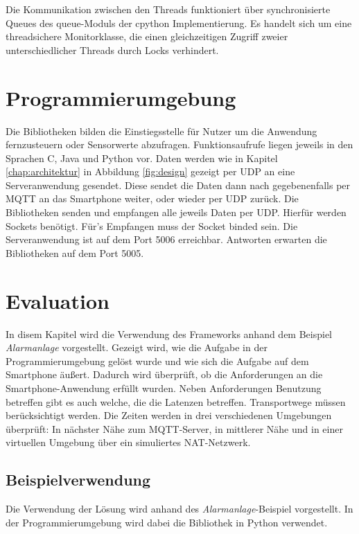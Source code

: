 \documentclass[11pt,a4paper]{report}
\begin{document}
Die Kommunikation zwischen den Threads funktioniert über synchronisierte Queues des queue-Moduls\cite{python_queue} der cpython Implementierung.
Es handelt sich um eine threadsichere Monitorklasse, die einen gleichzeitigen Zugriff zweier unterschiedlicher Threads durch Locks verhindert.

\chapter{Programmierumgebung}\label{chap:libs}
Die Bibliotheken bilden die Einstiegsstelle für Nutzer um die Anwendung fernzusteuern oder Sensorwerte abzufragen.
Funktionsaufrufe liegen jeweils in den Sprachen C, Java und Python vor.
Daten werden wie in Kapitel \ref{chap:architektur} in Abbildung \ref{fig:design} gezeigt per UDP an eine Serveranwendung gesendet.
Diese sendet die Daten dann nach gegebenenfalls per MQTT an das Smartphone weiter, oder wieder per UDP zurück.
Die Bibliotheken senden und empfangen alle jeweils Daten per UDP.
Hierfür werden Sockets benötigt.
Für's Empfangen muss der Socket binded sein.
Die Serveranwendung ist auf dem Port 5006 erreichbar.
Antworten erwarten die Bibliotheken auf dem Port 5005.

\chapter{Evaluation}\label{chap:eval}
In disem Kapitel wird die Verwendung des Frameworks anhand dem Beispiel \textit{Alarmanlage} vorgestellt.
Gezeigt wird, wie die Aufgabe in der Programmierumgebung gelöst wurde und wie sich die Aufgabe auf dem Smartphone äußert.
Dadurch wird überprüft, ob die Anforderungen an die Smartphone-Anwendung erfüllt wurden.
Neben Anforderungen Benutzung betreffen gibt es auch welche, die die Latenzen betreffen.
Transportwege müssen berücksichtigt werden.
Die Zeiten werden in drei verschiedenen Umgebungen überprüft: In nächster Nähe zum MQTT-Server, in mittlerer Nähe und in einer virtuellen Umgebung über ein simuliertes NAT-Netzwerk.

\section{Beispielverwendung}
Die Verwendung der Lösung wird anhand des \textit{Alarmanlage}-Beispiel vorgestellt.
In der Programmierumgebung wird dabei die Bibliothek in Python verwendet.
\end{document}
